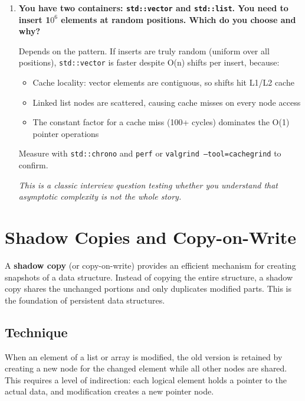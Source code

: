 \begin{enumerate}
\item \textbf{You have two containers: \texttt{std::vector} and \texttt{std::list}. You need to insert 1$0^{6}$ elements at random positions. Which do you choose and why?}

Depends on the pattern. If inserts are truly random (uniform over all positions), \texttt{std::vector} is faster despite O(n) shifts per insert, because:
\begin{itemize}
\item Cache locality: vector elements are contiguous, so shifts hit L1/L2 cache
\item Linked list nodes are scattered, causing cache misses on every node access
\item The constant factor for a cache miss (100+ cycles) dominates the O(1) pointer operations
\end{itemize}

Measure with \texttt{std::chrono} and \texttt{perf} or \texttt{valgrind --tool=cachegrind} to confirm.

\textit{This is a classic interview question testing whether you understand that asymptotic complexity is not the whole story.}
\end{enumerate}


\section{Shadow Copies and Copy-on-Write}
\label{sec:shadow-copies}

A \textbf{shadow copy} (or copy-on-write) provides an efficient mechanism for creating snapshots of a data structure. Instead of copying the entire structure, a shadow copy shares the unchanged portions and only duplicates modified parts. This is the foundation of persistent data structures.

\subsection{Technique}

When an element of a list or array is modified, the old version is retained by creating a new node for the changed element while all other nodes are shared. This requires a level of indirection: each logical element holds a pointer to the actual data, and modification creates a new pointer node.

